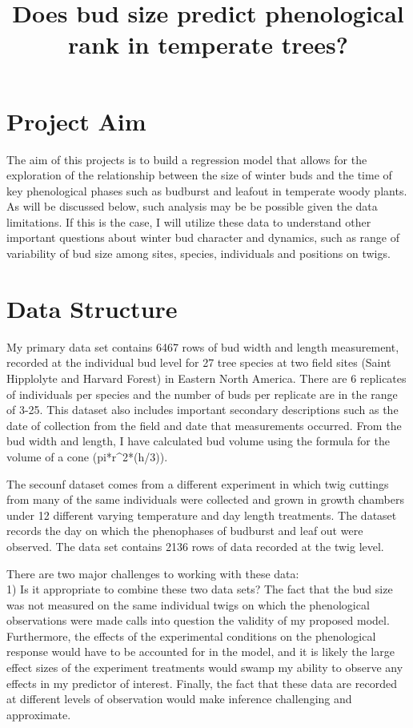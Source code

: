 \documentclass{article}\usepackage[]{graphicx}\usepackage[]{color}
\begin{document}
\title{Does bud size predict phenological rank in temperate trees?}
\section*{Project Aim}
The aim of this projects is to build a regression model that allows for the exploration of the relationship between the size of winter buds and the time of key phenological phases such as budburst and leafout in temperate woody plants. As will be discussed below, such analysis may be be possible given the data limitations. If this is the case, I will utilize these data to understand other important questions about winter bud character and dynamics, such as range of variability of bud size among sites, species, individuals and positions on twigs.
\section*{Data Structure}
My primary data set contains 6467 rows of bud width and length measurement, recorded at the individual bud level for 27 tree species at two field sites (Saint Hipplolyte and Harvard Forest) in Eastern North America. There are 6 replicates of individuals per species and the number of buds per replicate are in the range of 3-25. This dataset also includes important secondary descriptions such as the date of collection from the field and date that measurements occurred. From the bud width and length, I have calculated bud volume using the formula for the volume of a cone (pi*r^2*(h/3)).\par
The secounf dataset comes from a different experiment in which twig cuttings from many of the same individuals were collected and grown in growth chambers under 12 different varying temperature and day length treatments. The dataset records the day on which the phenophases of budburst and leaf out were observed. The data set contains 2136 rows of data recorded at the twig level.\par
There are two major challenges to working with these data:\\
1) Is it appropriate to combine these two data sets? The fact that the bud size was not measured on the same individual twigs on which the phenological observations were made calls into question the validity of my proposed model. Furthermore, the effects of the experimental conditions on the phenological response would have to be accounted for in the model, and it is likely the large effect sizes of the experiment treatments would swamp my ability to observe any effects in my predictor of interest. Finally, the fact that these data are recorded at different levels of observation would make inference challenging and approximate.\\
\end{document}
